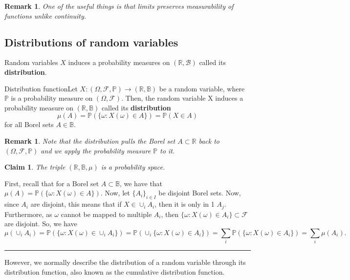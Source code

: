 \documentclass[twoside]{article}
\newtheorem{claim}[theorem]{Claim}
\newtheorem{remark}[theorem]{Remark}
\newenvironment{proof}{{\bf Proof:}}{\hfill\rule{2mm}{2mm}}
\newcommand{\borelsigmaalgebra}{\mathcal{B}}
\newcommand{\real}{\mathbb{R}}
\newcommand{\prob}{\mathbb{P}}
\begin{document}
\begin{remark}One of the useful things is that limits preserves measurability of functions unlike continuity.
\end{remark}

\subsection{Distributions of random variables}
Random variables $X$ induces a probability measures on $(\real, \borelsigmaalgebra)$ called its \textbf{distribution}.

\begin{definition_exam}{Distribution function}{}Let $X:(\Omega, \mathcal{F}, \prob) \rightarrow (\mathbb{R}, \mathbb{B})$ be a random variable, where $\prob$ is a probability measure on $(\Omega, \mathcal{F}).$ Then, the random variable X induces a probability measure on $(\mathbb{R}, \mathbb{B})$ called its \textbf{distribution} 
$$
\mu(A) = \prob(\{\omega: X(\omega) \in A\}) = \prob(X \in A)
$$
for all Borel sets $A \in \mathbb{B}.$
\end{definition_exam}

\begin{remark}Note that the distribution pulls the Borel set $A \subset \mathbb{R}$ back to $(\Omega, \mathcal{F}, \prob)$ and we apply the probability measure $\prob$ to it.
\end{remark}

\begin{claim}The triple $(\mathbb{R}, \mathbb{B}, \mu)$ is a probability space.
\end{claim}

\begin{proof} First, recall that for a Borel set $A \subset \mathbb{B}$, we have that $\mu(A) = \prob(\{\omega: X(\omega) \in A\}).$ Now, let $\{A_i\}_{i \in I}$ be disjoint Borel sets. Now, since $A_i$ are disjoint, this means that if $X \in \cup_iA_i$, then it is only in 1 $A_j$. Furthermore, as $\omega$ cannot be mapped to multiple $A_i$, then $\{\omega: X(\omega) \in A_i\} \subset \mathcal{F}$ are disjoint. So, we have 
$$
\mu(\cup_iA_i) = \prob(\{\omega: X(\omega) \in \cup_iA_i\}) = \prob(\cup_i\{\omega: X(\omega) \in A_i\})= \sum_i\prob(\{\omega: X(\omega) \in A_i\}) = \sum_i\mu(A_i).
$$
\end{proof}


However, we normally describe the distribution of a random variable through its distribution function, also known as the cumulative distribution function.
\end{document}
